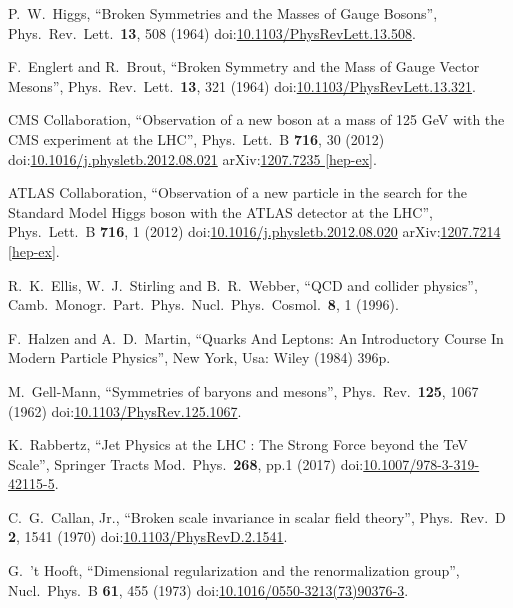 \begin{thebibliography}{99}
P.~W.~Higgs, ``Broken Symmetries and the Masses of Gauge Bosons'', Phys.\ Rev.\ Lett.\  {\bf 13}, 508 (1964) doi:\href{http://dx.doi.org/10.1103/PhysRevLett.13.508}{10.1103/PhysRevLett.13.508}.
  
F.~Englert and R.~Brout, ``Broken Symmetry and the Mass of Gauge Vector Mesons'', Phys.\ Rev.\ Lett.\  {\bf 13}, 321 (1964) doi:\href{http://dx.doi.org/10.1103/PhysRevLett.13.321  }{10.1103/PhysRevLett.13.321}.

CMS Collaboration, ``Observation of a new boson at a mass of 125 GeV with the CMS experiment at the LHC'', Phys.\ Lett.\ B {\bf 716}, 30 (2012) doi:\href{http://dx.doi.org/10.1016/j.physletb.2012.08.021}{10.1016/j.physletb.2012.08.021} arXiv:\href{https://arxiv.org/abs/1207.7235}{1207.7235 [hep-ex]}.

ATLAS Collaboration, ``Observation of a new particle in the search for the Standard Model Higgs boson with the ATLAS detector at the LHC'', Phys.\ Lett.\ B {\bf 716}, 1 (2012) doi:\href{http://dx.doi.org/10.1016/j.physletb.2012.08.020}{10.1016/j.physletb.2012.08.020} arXiv:\href{https://arxiv.org/abs/1207.7214}{1207.7214 [hep-ex]}.

R.~K.~Ellis, W.~J.~Stirling and B.~R.~Webber, ``QCD and collider physics'', Camb.\ Monogr.\ Part.\ Phys.\ Nucl.\ Phys.\ Cosmol.\ {\bf 8}, 1 (1996).

F.~Halzen and A.~D.~Martin, ``Quarks And Leptons: An Introductory Course In Modern Particle Physics'', New York, Usa: Wiley (1984) 396p.

M.~Gell-Mann, ``Symmetries of baryons and mesons'', Phys.\ Rev.\ {\bf 125}, 1067 (1962) doi:\href{http://dx.doi.org/10.1103/PhysRev.125.1067}{10.1103/PhysRev.125.1067}.

K.~Rabbertz, ``Jet Physics at the LHC : The Strong Force beyond the TeV Scale'', Springer Tracts Mod.\ Phys.\ {\bf 268}, pp.1 (2017) doi:\href{http://dx.doi.org/10.1007/978-3-319-42115-5}{10.1007/978-3-319-42115-5}.

C.~G.~Callan, Jr., ``Broken scale invariance in scalar field theory'', Phys.\ Rev.\ D {\bf 2}, 1541 (1970) doi:\href{http://dx.doi.org/10.1103/PhysRevD.2.1541}{10.1103/PhysRevD.2.1541}.

G.~'t Hooft, ``Dimensional regularization and the renormalization group'', Nucl.\ Phys.\ B {\bf 61}, 455 (1973) doi:\href{http://dx.doi.org/10.1016/0550-3213(73)90376-3}{10.1016/0550-3213(73)90376-3}.


\end{thebibliography}

